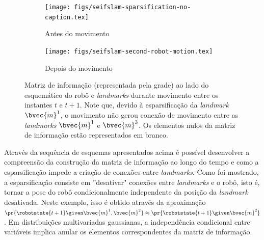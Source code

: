 \begin{figure}[h]
  \begin{subfigure}{0.475\textwidth}
    \texttt{[image: figs/seifslam-sparsification-no-caption.tex]}
    \caption{Antes do movimento}
  \end{subfigure}
  \hfill
  \begin{subfigure}{0.475\textwidth}
    \texttt{[image: figs/seifslam-second-robot-motion.tex]} 
    \caption{Depois do movimento}
    \label{fig:seifslam-info-matrix-construction-second-motion-b}
  \end{subfigure}
  \caption{Matriz de informação (representada pela grade) ao lado do esquemático do robô e \textit{landmarks} durante movimento entre os instantes $t$ e $t+1$. Note que, devido à esparsificação da \textit{landmark} $\bvec{m}^1$, o movimento não gerou conexão de movimento entre as \textit{landmarks} $\bvec{m}^1$ e $\bvec{m}^3$. Os elementos nulos da matriz de informação estão representados em branco.}
  \label{fig:seifslam-info-matrix-construction-second-motion}
\end{figure}

Através da sequência de esquemas apresentados acima é possível 
desenvolver a compreensão da construção da matriz de informação 
ao longo do tempo e como a esparsificação impede a criação de 
conexões entre \textit{landmarks}. Como foi mostrado, a 
esparsificação consiste em ''desativar" conexões entre \textit{landmarks} e o robô, isto é, tornar a pose do robô 
condicionalmente independente da posição da \textit{landmark} 
desativada. Neste exemplo, isso é obtido através da aproximação 
$\pr{\robotstate{t+1} \given \bvec{m}^1, \bvec{m}^2} \approx \pr{\robotstate{t+1} \given \bvec{m}^2}$. Em distribuições multivariadas gaussianas, a independência condicional entre 
variáveis implica anular os elementos correspondentes da matriz de informação.

